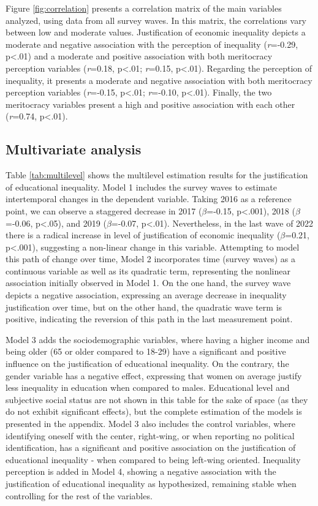 \documentclass[
  12pt,
  a4paper,
]{article}
\begin{document}
Figure \ref{fig:correlation} presents a correlation matrix of the main variables analyzed, using data from all survey waves. In this matrix, the correlations vary between low and moderate values. Justification of economic inequality depicts a moderate and negative association with the perception of inequality (\emph{r}=-0.29, p\textless.01) and a moderate and positive association with both meritocracy perception variables (\emph{r}=0.18, p\textless.01; \emph{r}=0.15, p\textless.01). Regarding the perception of inequality, it presents a moderate and negative association with both meritocracy perception variables (\emph{r}=-0.15, p\textless.01; \emph{r}=-0.10, p\textless.01). Finally, the two meritocracy variables present a high and positive association with each other (\emph{r}=0.74, p\textless.01).

\subsection{Multivariate analysis}\label{multivariate-analysis}

Table \ref{tab:multilevel} shows the multilevel estimation results for the justification of educational inequality. Model 1 includes the survey waves to estimate intertemporal changes in the dependent variable. Taking 2016 as a reference point, we can observe a staggered decrease in 2017 (\(\beta\)=-0.15, p\textless.001), 2018 (\(\beta\)=-0.06, p\textless.05), and 2019 (\(\beta\)=-0.07, p\textless.01). Nevertheless, in the last wave of 2022 there is a radical increase in level of justification of economic inequality (\(\beta\)=0.21, p\textless.001), suggesting a non-linear change in this variable. Attempting to model this path of change over time, Model 2 incorporates time (survey waves) as a continuous variable as well as its quadratic term, representing the nonlinear association initially observed in Model 1. On the one hand, the survey wave depicts a negative association, expressing an average decrease in inequality justification over time, but on the other hand, the quadratic wave term is positive, indicating the reversion of this path in the last measurement point.

Model 3 adds the sociodemographic variables, where having a higher income and being older (65 or older compared to 18-29) have a significant and positive influence on the justification of educational inequality. On the contrary, the gender variable has a negative effect, expressing that women on average justify less inequality in education when compared to males. Educational level and subjective social status are not shown in this table for the sake of space (as they do not exhibit significant effects), but the complete estimation of the models is presented in the appendix. Model 3 also includes the control variables, where identifying oneself with the center, right-wing, or when reporting no political identification, has a significant and positive association on the justification of educational inequality - when compared to being left-wing oriented. Inequality perception is added in Model 4, showing a negative association with the justification of educational inequality as hypothesized, remaining stable when controlling for the rest of the variables.
\end{document}
